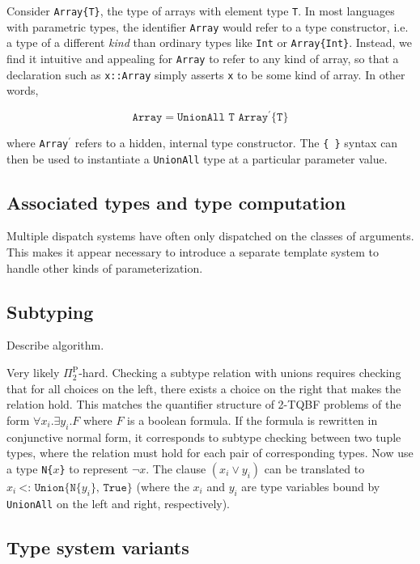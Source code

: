 Consider \texttt{Array\{T\}}, the type of arrays with element type \texttt{T}.
In most languages with parametric types, the identifier \texttt{Array} would
refer to a type constructor, i.e. a type of a different \emph{kind} than
ordinary types like \texttt{Int} or \texttt{Array\{Int\}}.
Instead, we find it intuitive and appealing for \texttt{Array} to refer to
any kind of array, so that a declaration such as \texttt{x::Array} simply
asserts \texttt{x} to be some kind of array. In other words,

\vspace{-2ex}
\[
\texttt{Array} = \texttt{UnionAll T Array$^\prime$\{T\}}
\]

\noindent
where \texttt{Array$^\prime$} refers to a hidden, internal type constructor.
The \texttt{\{ \}} syntax can then be used to instantiate a \texttt{UnionAll}
type at a particular parameter value.

\subsection{Associated types and type computation}


Multiple dispatch systems have often only dispatched on the classes of
arguments. This makes it appear necessary to introduce a separate
template system to handle other kinds of parameterization.


\subsection{Subtyping}

Describe algorithm.

Very likely $\Pi_2^{\textrm{P}}$-hard.
Checking a subtype relation with unions requires checking that for all choices
on the left, there exists a choice on the right that makes the relation hold.
This matches the quantifier structure of 2-TQBF problems of the form
$\forall x_i . \exists y_i . F$ where $F$ is a boolean formula. If the formula
is rewritten in conjunctive normal form, it corresponds to subtype checking
between two tuple types, where the relation must hold for each pair of
corresponding types. Now use a type \texttt{N\{}$x$\texttt{\}} to
represent $\neg x$. The clause $(x_i \vee y_i)$ can be translated to
$x_i\ \texttt{<:\ Union\{N\{}y_i\texttt{\}, True\}}$ (where the $x_i$ and
$y_i$ are type variables bound by \texttt{UnionAll} on the left and right,
respectively).


\subsection{Type system variants}

